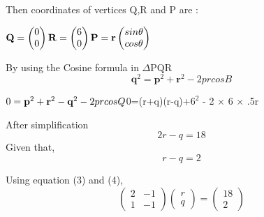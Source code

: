 \documentclass[10pt,a4paper]{article}
\let\vec\mathbf
\begin{document}
\begin{multicols}{2}
Then coordinates of vertices  Q,R and P are :\vspace{2mm}\\
\begin{center}$
\vec{
 Q =\begin{pmatrix}
0 \\
0 
\end{pmatrix} 
\vspace{1mm}
R=\begin{pmatrix}
6 \\
0 
\end{pmatrix} 
\vspace{1mm}
P=r\begin{pmatrix}
sin \theta\\
  cos \theta\\
\end{pmatrix} }
\vspace{1mm}$
\end{center}

\vspace{3mm} 
By using the Cosine formula in  $\Delta$PQR \\ 
\begin{equation}
\vec{q}^2=\vec{p}^2+\vec{r}^2-2prcosB 
\end{equation}
\begin{center}
$0=\vec{p}^2+\vec{r}^2 -\vec{q}^2-2prcosQ 
\vspace{5mm}
\newline
$0=(r+q)(r-q)+${6}^2$ - 2 $\times$ 6 $\times$ .5r\\
\vspace{5mm}
\end{center}
After simplification
\begin{equation}
   2r-q =18
\end{equation}
Given that,
\begin{equation}
r-q=2
\end{equation}


Using equation (3) and (4),
\begin{equation}
  \begin{pmatrix}
2 & -1\\
1 &-1
\end{pmatrix} 
\begin{pmatrix}
r\\
q
\end{pmatrix} 
=
\begin{pmatrix}
18 \\
 2\
\end{pmatrix}
\end{equation}\vspace{2mm}\\


\end{multicols}
\end{document}

